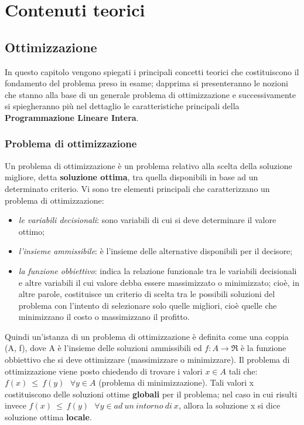 \chapter{Contenuti teorici}\label{ch:chapter1}

\section{Ottimizzazione}
In questo capitolo vengono spiegati i principali concetti teorici che costituiscono il fondamento del problema preso in esame; dapprima si presenteranno le nozioni che stanno alla base di un generale problema di ottimizzazione e successivamente si spiegheranno più nel dettaglio le caratteristiche principali della \textbf{Programmazione Lineare Intera}.

\subsection{Problema di ottimizzazione}
Un problema di ottimizzazione è un problema relativo alla scelta della soluzione migliore, detta \textbf{soluzione ottima}, tra quella disponibili in base ad un determinato criterio. Vi sono tre elementi principali che caratterizzano un problema di ottimizzazione:
\begin{itemize}
\item \textit{le variabili decisionali}: sono variabili di cui si deve determinare il valore ottimo;
\item \textit{l'insieme ammissibile}: è l'insieme delle alternative disponibili per il decisore;
\item \textit{la funzione obbiettivo}: indica la relazione funzionale tra le variabili decisionali e altre variabili il cui valore debba essere massimizzato o minimizzato; cioè, in altre parole, costituisce un criterio di scelta tra le possibili soluzioni del problema con l'intento di selezionare solo quelle migliori, cioè quelle che minimizzano il costo o massimizzano il profitto.
\end{itemize}

Quindi un'istanza di un problema di ottimizzazione è definita come una coppia (A, f), dove A è l'insieme delle soluzioni ammissibili ed $f: A \rightarrow \Re$ è la funzione obbiettivo che si deve ottimizzare (massimizzare o minimizzare).
Il problema di ottimizzazione viene posto chiedendo di trovare i valori $x \in A$ tali che: $f(x) ~ \leq ~ f(y) ~~~ \forall y \in A$  (problema di minimizzazione).
Tali valori x costituiscono delle soluzioni ottime \textbf{globali} per il problema; nel caso in cui risulti invece $f(x) ~ \leq ~ f(y) ~~~ \forall y \in ad ~ un ~ intorno ~ di ~ x$, allora la soluzione x si dice soluzione ottima \textbf{locale}. \\

